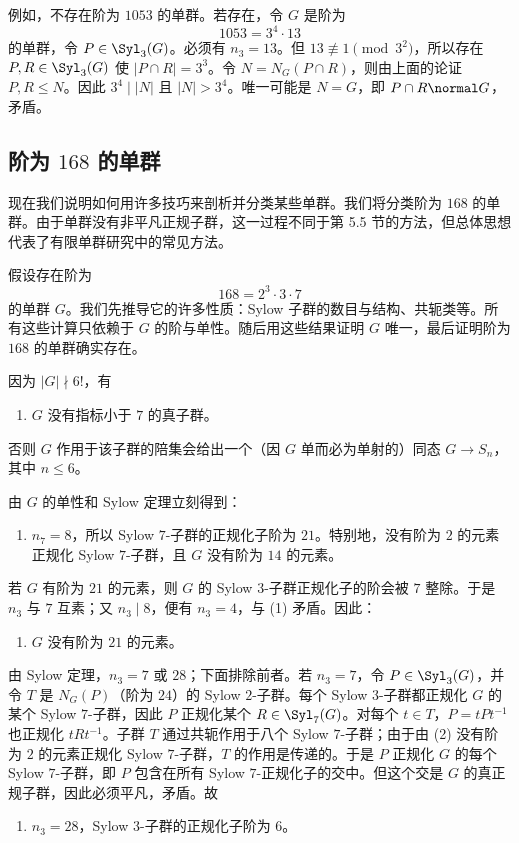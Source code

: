 例如，不存在阶为 $1053$ 的单群。若存在，令 $G$ 是阶为
\[
  1053=3^4\cdot13
\]
的单群，令 $P\in\Syl_3(G)$。必须有 $n_3=13$。但 $13\not\equiv1\pmod{3^2}$，所以存在 $P,R\in\Syl_3(G)$ 使 $|P\cap R|=3^3$。令 $N=N_G(P\cap R)$，则由上面的论证 $P,R\leq N$。因此 $3^4\mid |N|$ 且 $|N|>3^4$。唯一可能是 $N=G$，即 $P\cap R\normal G$，矛盾。

\subsection*{阶为 $168$ 的单群}

现在我们说明如何用许多技巧来剖析并分类某些单群。我们将分类阶为 $168$ 的单群。由于单群没有非平凡正规子群，这一过程不同于第 5.5 节的方法，但总体思想代表了有限单群研究中的常见方法。

假设存在阶为
\[
  168=2^3\cdot3\cdot7
\]
的单群 $G$。我们先推导它的许多性质：Sylow 子群的数目与结构、共轭类等。所有这些计算只依赖于 $G$ 的阶与单性。随后用这些结果证明 $G$ 唯一，最后证明阶为 $168$ 的单群确实存在。

因为 $|G|\nmid 6!$，有
\begin{enumerate}[label=(\arabic*)]
  \item $G$ 没有指标小于 $7$ 的真子群。
\end{enumerate}
否则 $G$ 作用于该子群的陪集会给出一个（因 $G$ 单而必为单射的）同态 $G\to S_n$，其中 $n\leq6$。

由 $G$ 的单性和 Sylow 定理立刻得到：
\begin{enumerate}[label=(\arabic*),resume]
  \item $n_7=8$，所以 Sylow $7$-子群的正规化子阶为 $21$。特别地，没有阶为 $2$ 的元素正规化 Sylow $7$-子群，且 $G$ 没有阶为 $14$ 的元素。
\end{enumerate}

若 $G$ 有阶为 $21$ 的元素，则 $G$ 的 Sylow $3$-子群正规化子的阶会被 $7$ 整除。于是 $n_3$ 与 $7$ 互素；又 $n_3\mid 8$，便有 $n_3=4$，与 (1) 矛盾。因此：
\begin{enumerate}[label=(\arabic*),resume]
  \item $G$ 没有阶为 $21$ 的元素。
\end{enumerate}

由 Sylow 定理，$n_3=7$ 或 $28$；下面排除前者。若 $n_3=7$，令 $P\in\Syl_3(G)$，并令 $T$ 是 $N_G(P)$（阶为 $24$）的 Sylow $2$-子群。每个 Sylow $3$-子群都正规化 $G$ 的某个 Sylow $7$-子群，因此 $P$ 正规化某个 $R\in\Syl_7(G)$。对每个 $t\in T$，$P=tPt^{-1}$ 也正规化 $tRt^{-1}$。子群 $T$ 通过共轭作用于八个 Sylow $7$-子群；由于由 (2) 没有阶为 $2$ 的元素正规化 Sylow $7$-子群，$T$ 的作用是传递的。于是 $P$ 正规化 $G$ 的每个 Sylow $7$-子群，即 $P$ 包含在所有 Sylow $7$-正规化子的交中。但这个交是 $G$ 的真正规子群，因此必须平凡，矛盾。故
\begin{enumerate}[label=(\arabic*),resume]
  \item $n_3=28$，Sylow $3$-子群的正规化子阶为 $6$。
\end{enumerate}

